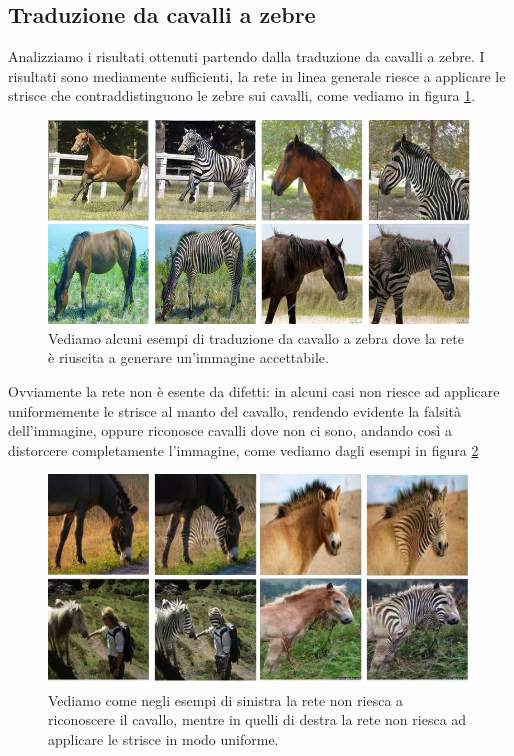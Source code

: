 \subsection{Traduzione da cavalli a zebre}
Analizziamo i risultati ottenuti partendo dalla traduzione da cavalli a zebre. I risultati sono mediamente sufficienti, la rete in linea generale riesce a applicare le strisce che contraddistinguono le zebre sui cavalli, come vediamo in figura \ref{fig:Risultati Cycle GAN base (1)}.
\begin{figure}[H]
\begin{center}
\includegraphics[width=1\columnwidth]{images/risultati cyclegan zebre.png}
\end{center}
\caption{Vediamo alcuni esempi di traduzione da cavallo a zebra dove la rete è riuscita a generare un'immagine accettabile.}
\label{fig:Risultati Cycle GAN base (1)}
\end{figure} 
Ovviamente la rete non è esente da difetti: in alcuni casi non riesce ad applicare uniformemente le strisce al manto del cavallo, rendendo evidente la falsità dell'immagine, oppure riconosce cavalli dove non ci sono, andando così a distorcere completamente l'immagine, come vediamo dagli esempi in figura \ref{fig:Risultati Errati Cycle GAN (1)} 

\begin{figure}[H]
\begin{center}
\includegraphics[width=1\columnwidth]{images/CycleGan zebre error.jpeg}
\end{center}
\caption{Vediamo come negli esempi di sinistra la rete non riesca a riconoscere il cavallo, mentre in quelli di destra la rete non riesca ad applicare le strisce in modo uniforme.}
\label{fig:Risultati Errati Cycle GAN (1)}
\end{figure} 

